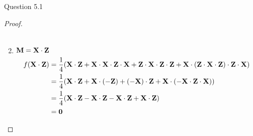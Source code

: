 \begin{solution}{Question 5.1}
\begin{proof}
\begin{enumerate}
\begin{equation}
\begin{split}
            \end{split}
        \end{equation}
        \item $\mathbf{M} = \mathbf{X} \cdot \mathbf{Z}$
        \begin{equation}
            \begin{split}
                f(\mathbf{X}\cdot\mathbf{Z}) &=\frac{1}{4}(\mathbf{X} \cdot \mathbf{Z} + \mathbf{X} \cdot \mathbf{X} \cdot \mathbf{Z} \cdot \mathbf{X} + \mathbf{Z} \cdot \mathbf{X} \cdot \mathbf{Z} \cdot \mathbf{Z}+ \mathbf{X} \cdot (\mathbf{Z} \cdot \mathbf{X} \cdot \mathbf{Z}) \cdot \mathbf{Z} \cdot \mathbf{X})\\
                &=\frac{1}{4}(\mathbf{X} \cdot \mathbf{Z} + \mathbf{X} \cdot (-\mathbf{Z}) + (-\mathbf{X}) \cdot \mathbf{Z}+ \mathbf{X} \cdot (-\mathbf{X} \cdot \mathbf{Z}\cdot \mathbf{X}))\\
                &=\frac{1}{4}(\mathbf{X} \cdot \mathbf{Z} - \mathbf{X} \cdot \mathbf{Z} -\mathbf{X} \cdot \mathbf{Z}+ \mathbf{X} \cdot \mathbf{Z})\\
                &=\mathbf{0}
            \end{split}
        \end{equation}
    \end{enumerate}
    
    \end{proof}
\end{solution}
